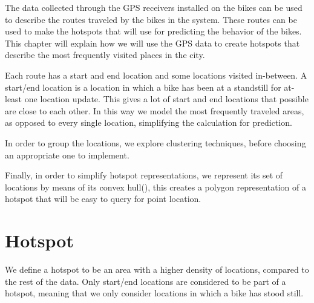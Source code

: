 The data collected through the GPS receivers installed on the bikes can be used to describe the routes traveled by the bikes in the system.
These routes can be used to make the hotspots that \projectname{} will use for predicting the behavior of the bikes.
This chapter will explain how we will use the GPS data to create hotspots that describe the most frequently visited places in the city.

Each route has a start and end location and some locations visited in-between. A start/end location is a location in which a bike has been at a standstill for at-least one location update.
This gives a lot of start and end locations that possible are close to each other.
In this way we model the most frequently traveled areas, as opposed to every single location, simplifying the calculation for prediction.

In order to group the locations, we explore clustering techniques, before choosing an appropriate one to implement.

Finally, in order to simplify hotspot representations, we represent its set of locations by means of its convex hull(\citet[section 33.3]{aadbook}), this creates a polygon representation of a hotspot that will be easy to query for point location.

\section{Hotspot}\label{hotspot}
We define a hotspot to be an area with a higher density of locations, compared to the rest of the data. Only start/end locations are considered to be part of a hotspot, meaning that we only consider locations in which a bike has stood still.
